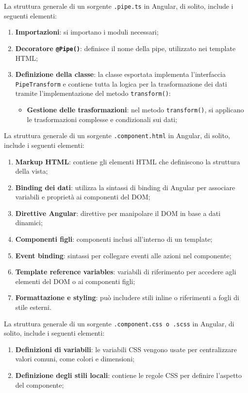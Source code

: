 La struttura generale di un sorgente \texttt{.pipe.ts} in Angular, di solito, include i seguenti elementi:
\begin{enumerate}
    \item \textbf{Importazioni}: si importano i moduli necessari;
    \item \textbf{Decoratore \texttt{@Pipe()}}: definisce il nome della pipe, utilizzato nei template HTML;
    \item \textbf{Definizione della classe}: la classe esportata implementa l'interfaccia \\ \texttt{PipeTransform} e contiene tutta la logica per la trasformazione dei dati tramite l'implementazione del metodo \texttt{transform()}:
    \begin{itemize}
        \item \textbf{Gestione delle trasformazioni}: nel metodo \texttt{transform()}, si applicano le trasformazioni complesse e condizionali sui dati;
    \end{itemize}
\end{enumerate}

La struttura generale di un sorgente \texttt{.component.html} in Angular, di solito, include i seguenti elementi:
\begin{enumerate}
    \item \textbf{Markup HTML}: contiene gli elementi HTML che definiscono la struttura della vista;
    \item \textbf{Binding dei dati}: utilizza la sintassi di binding di Angular per associare variabili e proprietà ai componenti del DOM;
    \item \textbf{Direttive Angular}: direttive per manipolare il DOM in base a dati dinamici;
    \item \textbf{Componenti figli}: componenti inclusi all'interno di un template;
    \item \textbf{Event binding}: sintassi per collegare eventi alle azioni nel componente;
    \item \textbf{Template reference variables}: variabili di riferimento per accedere agli elementi del DOM o ai componenti figli;
    \item \textbf{Formattazione e styling}: può includere stili inline o riferimenti a fogli di stile esterni.
\end{enumerate}

La struttura generale di un sorgente \texttt{.component.css o .scss} in Angular, di solito, include i seguenti elementi:
\begin{enumerate}
    \item \textbf{Definizioni di variabili}: le variabili CSS vengono usate per centralizzare valori comuni, come colori e dimensioni;
    \item \textbf{Definizione degli stili locali}: contiene le regole CSS per definire l'aspetto del componente;
\end{enumerate}

